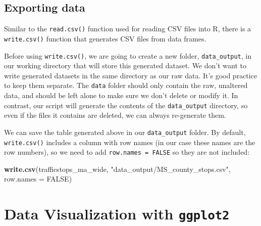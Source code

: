 \documentclass[]{book}
\newenvironment{Shaded}{\begin{snugshade}}{\end{snugshade}}
\newcommand{\DataTypeTok}[1]{\textcolor[rgb]{0.13,0.29,0.53}{#1}}
\newcommand{\KeywordTok}[1]{\textcolor[rgb]{0.13,0.29,0.53}{\textbf{#1}}}
\newcommand{\NormalTok}[1]{#1}
\newcommand{\OtherTok}[1]{\textcolor[rgb]{0.56,0.35,0.01}{#1}}
\newcommand{\StringTok}[1]{\textcolor[rgb]{0.31,0.60,0.02}{#1}}
\begin{document}
\hypertarget{exporting-data}{%
\section{Exporting data}\label{exporting-data}}

Similar to the \texttt{read.csv()} function used for reading CSV files into R, there is a \texttt{write.csv()} function that generates CSV files from data frames.

Before using \texttt{write.csv()}, we are going to create a new folder, \texttt{data\_output},
in our working directory that will store this generated dataset. We don't want
to write generated datasets in the same directory as our raw data. It's good
practice to keep them separate. The \texttt{data} folder should only contain the raw,
unaltered data, and should be left alone to make sure we don't delete or modify
it. In contrast, our script will generate the contents of the \texttt{data\_output}
directory, so even if the files it contains are deleted, we can always
re-generate them.

We can save the table generated above in our \texttt{data\_output}
folder. By default, \texttt{write.csv()} includes a column with row names (in our case
these names are the row numbers), so we need to add \texttt{row.names\ =\ FALSE} so
they are not included:

\begin{Shaded}
\begin{Highlighting}[]
\KeywordTok{write.csv}\NormalTok{(trafficstops_ma_wide, }\StringTok{"data_output/MS_county_stops.csv"}\NormalTok{, }\DataTypeTok{row.names =} \OtherTok{FALSE}\NormalTok{)}
\end{Highlighting}
\end{Shaded}

\hypertarget{data-visualization-with-ggplot2}{%
\chapter{\texorpdfstring{Data Visualization with \texttt{ggplot2}}{Data Visualization with ggplot2}}\label{data-visualization-with-ggplot2}}
\end{document}
